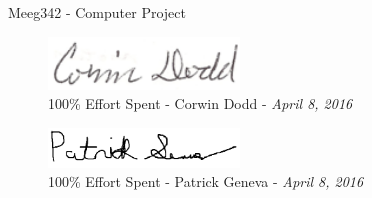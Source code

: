 %
%
\vspace*{20mm}
%
\Huge
\begin{center}
Meeg342 - Computer Project
\end{center}
\normalsize
%
\vspace{10mm}
%
\begin{figure}[H]
    \centering
    \includegraphics[width=2in]{pictures/sig_cory.png}
    \captionsetup{labelformat=empty}
    \caption{100\% Effort Spent - Corwin Dodd - \textit{April 8, 2016}}
\end{figure}
%
\begin{figure}[H]
    \centering
    \includegraphics[width=2in]{pictures/sig_pat.png}
    \captionsetup{labelformat=empty}
    \caption{100\% Effort Spent - Patrick Geneva - \textit{April 8, 2016}}
\end{figure}

\setcounter{figure}{0}
